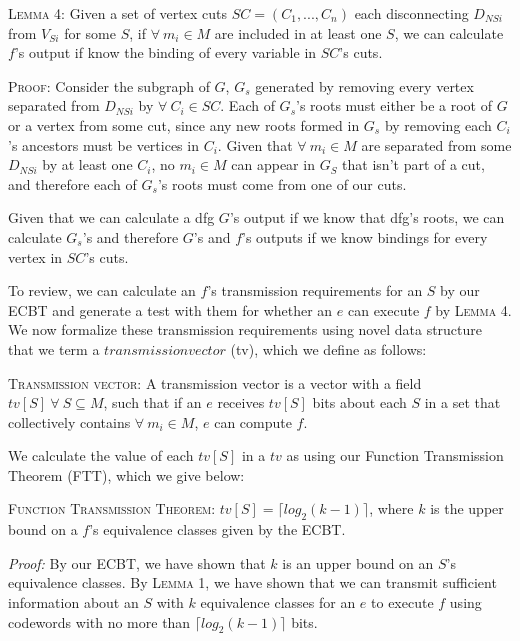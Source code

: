 \noindent \textsc{Lemma 4:} Given a set of vertex cuts $SC = (C_1, ..., C_n)$ each disconnecting $D_{NSi}$ from $V_{Si}$ for some $S$, if $\forall\ m_i \in M$ are included in at least one $S$, we can calculate $f$'s output if know the binding of every variable in $SC$'s cuts.
\vspace{1mm}

\noindent \textsc{Proof:} Consider the subgraph of $G$, $G_s$ generated by removing  every vertex separated from $D_{NSi}$ by $\forall\ C_i \in SC$. Each of $G_s$'s roots must either be a root of $G$ or a vertex from some cut, since any new roots formed in $G_s$ by removing each $C_i$'s ancestors must be vertices in $C_i$. Given that $\forall\ m_i \in M$  are separated from some $D_{NSi}$  by at least one $C_i$, no $m_i \in M$ can appear in $G_S$  that isn't part of a cut, and therefore  each of $G_s$'s roots must come from one of our cuts.

Given that we can calculate a dfg $G$'s output if we know that dfg's roots,  we can calculate $G_s$'s and therefore $G$'s and $f$'s outputs if we know bindings for every vertex in $SC$'s cuts.

 To review, we can calculate an $f$'s transmission requirements for an $S$ by our ECBT and generate a test with them for whether an $e$ can execute $f$ by \textsc{Lemma 4}. We now formalize these transmission requirements using novel data structure that we term a $transmission vector$ (tv), which we define as follows:
\vspace{1mm}

\noindent \textsc{Transmission vector:} A transmission vector is a vector with a field $tv[S]\ \forall\ S \subseteq M$, such that if an $e$ receives $tv[S]$ bits about each $S$ in a set that collectively contains $\forall\ m_i \in M$, $e$ can compute $f$.
\vspace{1mm}

We calculate the value of each $tv[S]$ in a $tv$ as using our Function Transmission Theorem (FTT), which we give below:

\noindent \textsc{Function Transmission Theorem:} $tv[S] = \lceil log_2(k-1) \rceil$, where $k$ is the upper bound on a $f$'s equivalence classes given by the ECBT.
\vspace{1mm}

\noindent \textit{Proof:} By our ECBT, we have shown that $k$ is an upper bound  on an $S$'s equivalence classes. By \textsc{Lemma 1}, we have shown that we can transmit sufficient information about an $S$ with $k$ equivalence classes for an $e$ to execute $f$ using codewords with no more than $\lceil log_2(k-1) \rceil$ bits.

